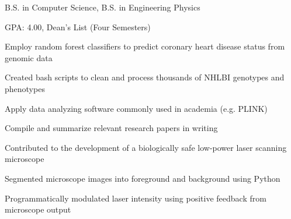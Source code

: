 \documentclass{resume}
\begin{document}
\begin{education}
    \begin{description}
        \item B.S. in Computer Science, B.S. in Engineering Physics
        \item GPA: 4.00, Dean's List (Four Semesters)
    \end{description}
\end{education}

\begin{research experience}
    \begin{description}
        \item Employ random forest classifiers to predict coronary heart disease status from genomic data
        \item Created bash scripts to clean and process thousands of NHLBI genotypes and phenotypes
        \item Apply data analyzing software commonly used in academia (e.g. PLINK)
        \item Compile and summarize relevant research papers in writing
    \end{description}

    \begin{description}
        \item Contributed to the development of a biologically safe low-power laser scanning microscope
        \item Segmented microscope images into foreground and background using Python
        \item Programmatically modulated laser intensity using positive feedback from microscope output
    \end{description}
\end{research experience}
\end{document}
